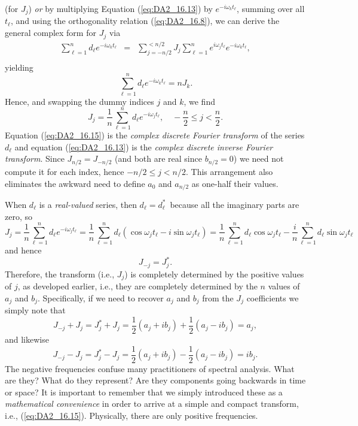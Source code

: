 (for $J_j$) \emph{or} by multiplying Equation (\ref{eq:DA2_16.13}) by $e^{-i\omega_k t_{\ell}}$, summing over all $t_{\ell}$, and using the
orthogonality relation (\ref{eq:DA2_16.8}), we can derive the general complex form for $J_j$ via
$$
\begin{array}{rcl}
\displaystyle \sum^{n}_{\ell=1} d_{\ell} e^{-i \omega_k t_{\ell}}&=& \displaystyle \sum^{< n/2}_{j = -n/2} J_j \sum^{n}_{\ell=1} e^{i \omega_j t_{\ell}} e^{-i \omega_k t_{\ell}},\\
\end{array}
$$
yielding
\begin{equation}
\displaystyle \sum^{n}_{\ell=1} d_{\ell} e^{-i \omega_k t_{\ell}} = n J_k.
\end{equation}
Hence, and swapping the dummy indices $j$ and $k$, we find
\begin{equation}
\boxed{J_j = \displaystyle \frac{1}{n} \sum^{n}_{\ell=1} d_{\ell} e^{-i \omega_j t_{\ell}} , \quad -\frac{n}{2} \leq j < \frac{n}{2}.}
\label{eq:DA2_16.15}
\end{equation}
Equation (\ref{eq:DA2_16.15}) is the \emph{complex discrete Fourier transform} of the series $d_{\ell}$ and equation (\ref{eq:DA2_16.13}) is
the \emph{complex discrete inverse Fourier transform}. Since $J_{n/2} = J_{-n/2}$ (and both are real since $b_{n/2} = 0$) we need not compute it for each index,
hence $-n/2 \leq j < n/2$. This arrangement also eliminates the awkward need to define $a_0$ and $a_{n/2}$ as one-half their values.

When $d_{\ell}$ is a \emph{real-valued} series, then $d_{\ell}=d^*_{\ell}$~because all the imaginary parts are zero, so
$$
J_j=\frac{1}{n} \sum^{n}_{\ell=1} d_{\ell} e^{-i \omega_j t_{\ell}} = \frac{1}{n} \sum^{n}_{\ell=1} d_{\ell} (\cos \omega_j t_{\ell} - i \sin \omega_j t_{\ell})
= \frac{1}{n} \sum^{n}_{\ell=1} d_{\ell} \cos \omega_j t_{\ell} - \frac{i}{n} \sum^{n}_{\ell=1} d_{\ell} \sin \omega_j t_{\ell}
$$
and hence
$$
J_{-j} = J^\ast_j.
$$
Therefore, the transform (i.e., $J_j$) is completely determined by the positive values of $j$, as
developed earlier, i.e., they are completely determined by the $n$ values of $a_j$ and $b_j$.
Specifically, if we need to recover $a_j$ and $b_j$ from the $J_j$ coefficients we simply note that
\begin{equation}
	J_{-j} + J_j = J^\ast_j + J_j = \frac{1}{2} (a_j+ib_j) + \frac{1}{2} (a_j-ib_j) = a_j,
\end{equation}
and likewise
\begin{equation}
	J_{-j} - J_j = J^\ast_j - J_j = \frac{1}{2} (a_j+ib_j) - \frac{1}{2} (a_j-ib_j) = i b_j.
\end{equation}
The negative frequencies confuse many practitioners of spectral analysis.  What are they? What do they represent?
Are they components going backwards in time or space? 
It is important to remember that we simply introduced these as a \emph{mathematical convenience} in order to arrive at a
simple and compact transform, i.e., (\ref{eq:DA2_16.15}).  Physically, there are only positive frequencies.

